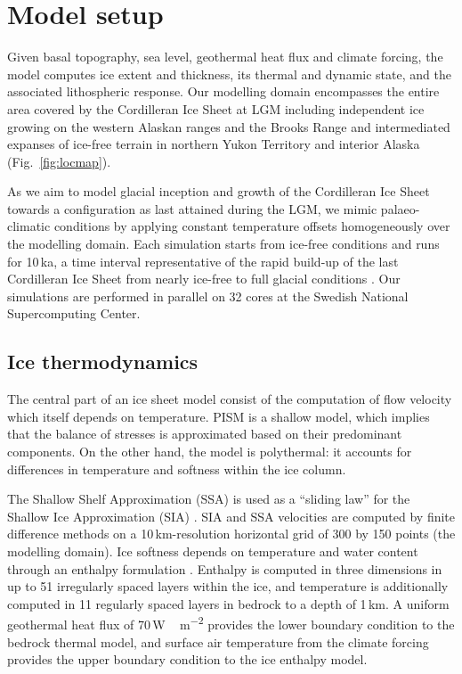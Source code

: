 \section{Model setup}
\label{sec:model}

Given basal topography, sea level, geothermal heat flux and climate forcing, the model computes ice extent and thickness, its thermal and dynamic state, and the associated lithospheric response. Our modelling domain encompasses the entire area covered by the Cordilleran Ice Sheet at LGM including independent ice growing on the western Alaskan ranges and the Brooks Range and intermediated expanses of ice-free terrain in northern Yukon Territory and interior Alaska (Fig.~\ref{fig:locmap}).

As we aim to model glacial inception and growth of the Cordilleran Ice Sheet towards a configuration as last attained during the LGM, we mimic palaeo-climatic conditions by applying constant temperature offsets homogeneously over the modelling domain. Each simulation starts from ice-free conditions and runs for 10\,ka, a time interval representative of the rapid build-up of the last Cordilleran Ice Sheet from nearly ice-free to full glacial conditions \citep{clague-1989,stroeven-etal-2010}. Our simulations are performed in parallel on 32 cores at the Swedish National Supercomputing Center.

\subsection{Ice thermodynamics}

The central part of an ice sheet model consist of the computation of flow velocity which itself depends on temperature. PISM is a shallow model, which implies that the balance of stresses is approximated based on their predominant components. On the other hand, the model is polythermal: it accounts for differences in temperature and softness within the ice column.

The Shallow Shelf Approximation (SSA) is used as a ``sliding law'' for the Shallow Ice Approximation (SIA) \citep{bueler-brown-2009,winkelmann-etal-2011}. SIA and SSA velocities are computed by finite difference methods on a 10\,km-resolution horizontal grid of 300 by 150 points (the modelling domain). Ice softness depends on temperature and water content through an enthalpy formulation \citep{aschwanden-blatter-2009,aschwanden-etal-2012}. Enthalpy is computed in three dimensions in up to 51 irregularly spaced layers within the ice, and temperature is additionally computed in 11 regularly spaced layers in bedrock to a depth of 1\,km. A uniform geothermal heat flux of 70\,\unit{W\,m^{-2}} provides the lower boundary condition to the bedrock thermal model, and surface air temperature from the climate forcing provides the upper boundary condition to the ice enthalpy model.

